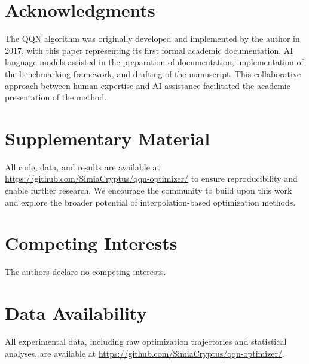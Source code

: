 \hypertarget{acknowledgments}{%
\section{Acknowledgments}\label{acknowledgments}}

The QQN algorithm was originally developed and implemented by the author in 2017, with this paper representing its first formal academic documentation.
AI language models assisted in the preparation of documentation, implementation of the benchmarking framework, and drafting of the manuscript.
This collaborative approach between human expertise and AI assistance facilitated the academic presentation of the method.

\hypertarget{supplementary-material}{%
\section{Supplementary Material}\label{supplementary-material}}

All code, data, and results are available at \url{https://github.com/SimiaCryptus/qqn-optimizer/} to ensure reproducibility and enable further research.
We encourage the community to build upon this work and explore the broader potential of interpolation-based optimization methods.

\hypertarget{competing-interests}{%
\section{Competing Interests}\label{competing-interests}}

The authors declare no competing interests.

\hypertarget{data-availability}{%
\section{Data Availability}\label{data-availability}}

All experimental data, including raw optimization trajectories and statistical analyses, are available at \url{https://github.com/SimiaCryptus/qqn-optimizer/}.
